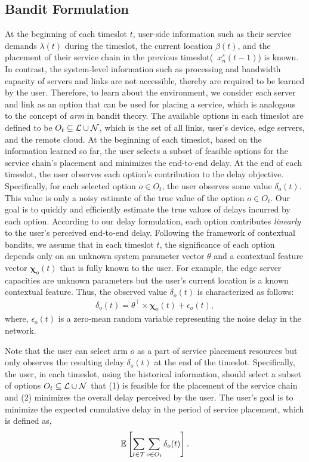 \subsection{Bandit Formulation}
\label{section_bandit_formulation}
At the beginning of each timeslot $t$,
user-side information such as their service demands $\lambda(t)$ during the timeslot, the current location $\beta(t)$, and the placement of their service chain in the previous timeslot(\ie\ $x_n^s(t-1)$) is known. In contrast, the system-level information such as processing and bandwidth capacity of servers and links are not accessible, thereby are required to be learned by the user. 
%
Therefore, to learn about the environment, we consider each server and link as an option that can be used for placing a service, which is analogous to the concept of \emph{arm} in bandit theory. The available options in each timeslot are defined to be $O_{t}\subseteq \mathcal{L}\cup\mathcal{N}$, which is the set of all links, user's device, edge servers, and the remote cloud. At the beginning of each timeslot, based on the information learned so far, the user selects a subset of feasible options for the service chain's placement and minimizes the end-to-end delay. At the end of each timeslot, the user observes each option's contribution to the delay objective. Specifically, for each selected option $o\in O_{t}$, the user observes some value $\delta_{o}(t)$. This value is only a noisy estimate of the true value of the option $o\in O_{t}$. Our goal is to quickly and efficiently estimate the true values of delays incurred by each option.
%
According to our delay formulation, each option contributes \emph{linearly} to the user's perceived end-to-end delay. Following the framework of contextual bandits, we assume that in each timeslot $t$, the significance of each option depends only on an unknown system parameter vector $\theta$ and a contextual feature vector $\pmb{\chi}_{o}(t)$ that is fully known to the user. For example, the edge server capacities are unknown parameters but the user's current location is a known contextual feature.
%
Thus, the observed value $\delta_{o}(t)$ is characterized as follows:
\begin{gather}
	\delta_{o}(t) = \theta^{\intercal} \times \pmb{\chi}_{o}(t) + \epsilon_{o}(t),
\end{gather}
where, $\epsilon_{o}(t)$ is a zero-mean random variable representing the noise delay in the network. 
%

Note that the user can select arm $o$ as a part of service placement resources but only observes the resulting delay $\delta_{o}(t)$ at the end of the timeslot. Specifically, the user, in each timeslot, using the historical information, should select a subset of options $O_{t}\subseteq \mathcal{L}\cup\mathcal{N}$ that (1) is feasible for the placement of the service chain and (2) minimizes the overall delay perceived by the user. The user's goal is to minimize the expected cumulative delay in the period of service placement, which is defined as,
\begin{gather}
	\mathbb{E}\left[\sum_{t\in\mathcal{T}} \sum_{o\in O_{t}} \delta_{o}(t)\right].
\end{gather}

